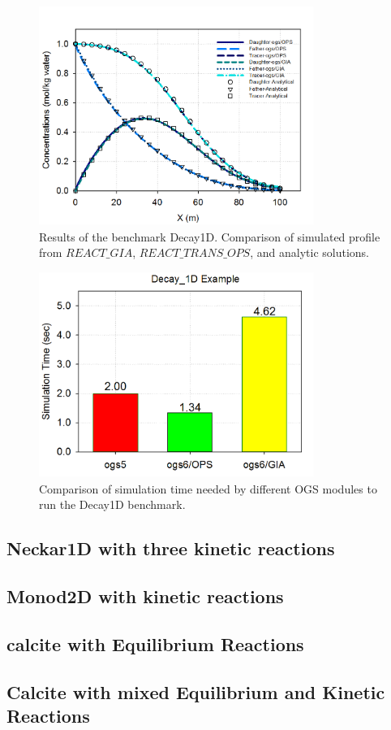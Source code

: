 \begin{figure}
\includegraphics[width=0.8\textwidth]{RT/figs/RT_fig_decay1d_results}
\caption{Results of the benchmark Decay1D. Comparison of simulated profile from $REACT\_GIA$, $REACT\_TRANS\_OPS$, and analytic solutions. }
\label{fig:RT_fig_decay1d_results}
\end{figure}

\begin{figure}
\includegraphics[width=0.8\textwidth]{RT/figs/RT_fig_decay1d_performance}
\caption{Comparison of simulation time needed by different OGS modules to run the Decay1D benchmark. }
\label{fig:RT_fig_decay1d_performance}
\end{figure}

\subsection{Neckar1D with three kinetic reactions}




\subsection{Monod2D with kinetic reactions}

\subsection{calcite with Equilibrium Reactions}

\subsection{Calcite with mixed Equilibrium and Kinetic Reactions}